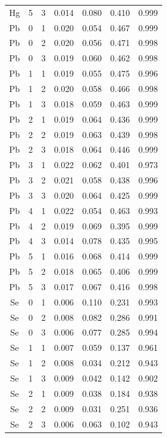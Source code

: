 \documentclass[ms, hidelinks]{uncgdissertationexp}
\theoremstyle{plain}
\theoremstyle{definition}
\theoremstyle{remark}
\begin{document}
\begin{longtable}{ccccccc}
Hg & 5 & 3 & 0.014 & 0.080 & 0.410 & 0.999\\
\rowcolor{gray!6}  Pb & 0 & 1 & 0.020 & 0.054 & 0.467 & 0.999\\
Pb & 0 & 2 & 0.020 & 0.056 & 0.471 & 0.998\\
\rowcolor{gray!6}  Pb & 0 & 3 & 0.019 & 0.060 & 0.462 & 0.998\\
Pb & 1 & 1 & 0.019 & 0.055 & 0.475 & 0.996\\
\rowcolor{gray!6}  Pb & 1 & 2 & 0.020 & 0.058 & 0.466 & 0.998\\
Pb & 1 & 3 & 0.018 & 0.059 & 0.463 & 0.999\\
\rowcolor{gray!6}  Pb & 2 & 1 & 0.019 & 0.064 & 0.436 & 0.999\\
Pb & 2 & 2 & 0.019 & 0.063 & 0.439 & 0.998\\
\rowcolor{gray!6}  Pb & 2 & 3 & 0.018 & 0.064 & 0.446 & 0.999\\
Pb & 3 & 1 & 0.022 & 0.062 & 0.401 & 0.973\\
\rowcolor{gray!6}  Pb & 3 & 2 & 0.021 & 0.058 & 0.438 & 0.996\\
Pb & 3 & 3 & 0.020 & 0.064 & 0.425 & 0.999\\
\rowcolor{gray!6}  Pb & 4 & 1 & 0.022 & 0.054 & 0.463 & 0.993\\
Pb & 4 & 2 & 0.019 & 0.069 & 0.395 & 0.999\\
\rowcolor{gray!6}  Pb & 4 & 3 & 0.014 & 0.078 & 0.435 & 0.995\\
Pb & 5 & 1 & 0.016 & 0.068 & 0.414 & 0.999\\
\rowcolor{gray!6}  Pb & 5 & 2 & 0.018 & 0.065 & 0.406 & 0.999\\
Pb & 5 & 3 & 0.017 & 0.067 & 0.416 & 0.998\\
\rowcolor{gray!6}  Se & 0 & 1 & 0.006 & 0.110 & 0.231 & 0.993\\
Se & 0 & 2 & 0.008 & 0.082 & 0.286 & 0.991\\
\rowcolor{gray!6}  Se & 0 & 3 & 0.006 & 0.077 & 0.285 & 0.994\\
Se & 1 & 1 & 0.007 & 0.059 & 0.137 & 0.961\\
\rowcolor{gray!6}  Se & 1 & 2 & 0.008 & 0.034 & 0.212 & 0.943\\
Se & 1 & 3 & 0.009 & 0.042 & 0.142 & 0.902\\
\rowcolor{gray!6}  Se & 2 & 1 & 0.009 & 0.038 & 0.184 & 0.938\\
Se & 2 & 2 & 0.009 & 0.031 & 0.251 & 0.936\\
\rowcolor{gray!6}  Se & 2 & 3 & 0.006 & 0.063 & 0.102 & 0.943\\

\end{longtable}
\end{document}
